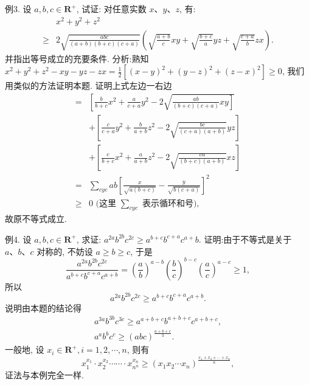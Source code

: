 例3. 设 $a, b, c \in \mathbf{R}^{+}$, 试证: 对任意实数 $x 、 y 、 z$, 有:
$$
\begin{aligned}
& x^2+y^2+z^2 \\
\geqslant & 2 \sqrt{\frac{a b c}{(a+b)(b+c)(c+a)}}\left(\sqrt{\frac{a+b}{c}} x y+\sqrt{\frac{b+c}{a}} y z+\sqrt{\frac{c+a}{b}} z x\right) .
\end{aligned}
$$
并指出等号成立的充要条件.
分析:熟知 $x^2+y^2+z^2-x y-y z-z x=\frac{1}{2}\left[(x-y)^2+(y-z)^2+\right. \left.(z-x)^2\right] \geqslant 0$, 我们用类似的方法证明本题.
证明上式左边一右边
$$
\begin{aligned}
= & {\left[\frac{b}{b+c} x^2+\frac{a}{c+a} y^2-2 \sqrt{\left.\frac{a b}{(b+c)(c+a)} x y\right]}\right.} \\
& +\left[\frac{c}{c+a} y^2+\frac{b}{a+b} z^2-2 \sqrt{\frac{b c}{(c+a)(a+b)}} y z\right] \\
& +\left[\frac{c}{b+c} x^2+\frac{a}{a+b} z^2-2 \sqrt{\frac{c a}{(b+c)(a+b)}} x z\right] \\
= & \sum_{c y c} a b\left[\frac{x}{\sqrt{a(b+c)}}-\frac{y}{\sqrt{b(c+a)}}\right]^2 \\
\geqslant & 0 \text { (这里 } \sum_{c y c} \text { 表示循环和号), }
\end{aligned}
$$
故原不等式成立.



例4. 设 $a, b, c \in \mathbf{R}^{+}$, 求证: $a^{2 a} b^{2 b} c^{2 c} \geqslant a^{b+c} b^{c+a} c^{a+} b$.
证明:由于不等式是关于 $a 、 b 、 c$ 对称的, 不妨设 $a \geqslant b \geqslant c$, 于是
$$
\frac{a^{2 a} b^{2 b} c^{2 c}}{a^{b+c} b^{c+a} c^{a+b}}=\left(\frac{a}{b}\right)^{a-b}\left(\frac{b}{c}\right)^{b-c}\left(\frac{a}{c}\right)^{a-c} \geqslant 1,
$$
所以
$$
a^{2 a} b^{2 b} c^{2 c} \geqslant a^{b+c} b^{c+a} c^{a+b} .
$$
说明由本题的结论得
$$
\begin{gathered}
a^{3 a} b^{3 b} c^{3 c} \geqslant a^{a+b+c} b^{a+b+c} c^{a+b+c}, \\
a^a b^b c^c \geqslant(a b c)^{\frac{a+b+c}{3}} .
\end{gathered}
$$
一般地, 设 $x_i \in \mathbf{R}^{+}, i=1,2, \cdots, n$, 则有
$$
x_1^{x_1} \cdot x_2^{x_2} \cdots \cdots \cdot x_{n^n}^{x_n} \geqslant\left(x_1 x_2 \cdots x_n\right)^{\frac{x_1+x_3+\cdots+x_n}{n}},
$$
证法与本例完全一样.



